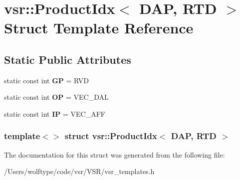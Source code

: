 \hypertarget{structvsr_1_1_product_idx_3_01_d_a_p_00_01_r_t_d_01_4}{\section{vsr\-:\-:Product\-Idx$<$ D\-A\-P, R\-T\-D $>$ Struct Template Reference}
\label{structvsr_1_1_product_idx_3_01_d_a_p_00_01_r_t_d_01_4}
}
\subsection*{Static Public Attributes}
\begin{DoxyCompactItemize}
\item 
\hypertarget{structvsr_1_1_product_idx_3_01_d_a_p_00_01_r_t_d_01_4_a81daf960a2d761b6b7061d16929fe693}{static const int {\bfseries G\-P} = R\-V\-D}\label{structvsr_1_1_product_idx_3_01_d_a_p_00_01_r_t_d_01_4_a81daf960a2d761b6b7061d16929fe693}

\item 
\hypertarget{structvsr_1_1_product_idx_3_01_d_a_p_00_01_r_t_d_01_4_a554cfb396518754fc7d47fbd9499fa69}{static const int {\bfseries O\-P} = V\-E\-C\-\_\-\-D\-A\-L}\label{structvsr_1_1_product_idx_3_01_d_a_p_00_01_r_t_d_01_4_a554cfb396518754fc7d47fbd9499fa69}

\item 
\hypertarget{structvsr_1_1_product_idx_3_01_d_a_p_00_01_r_t_d_01_4_a0c0928150a2aa4ac687ede4f736a0cd5}{static const int {\bfseries I\-P} = V\-E\-C\-\_\-\-A\-F\-F}\label{structvsr_1_1_product_idx_3_01_d_a_p_00_01_r_t_d_01_4_a0c0928150a2aa4ac687ede4f736a0cd5}

\end{DoxyCompactItemize}
\subsubsection*{template$<$$>$ struct vsr\-::\-Product\-Idx$<$ D\-A\-P, R\-T\-D $>$}



The documentation for this struct was generated from the following file\-:\begin{DoxyCompactItemize}
\item 
/\-Users/wolftype/code/vsr/\-V\-S\-R/vsr\-\_\-templates.\-h\end{DoxyCompactItemize}
